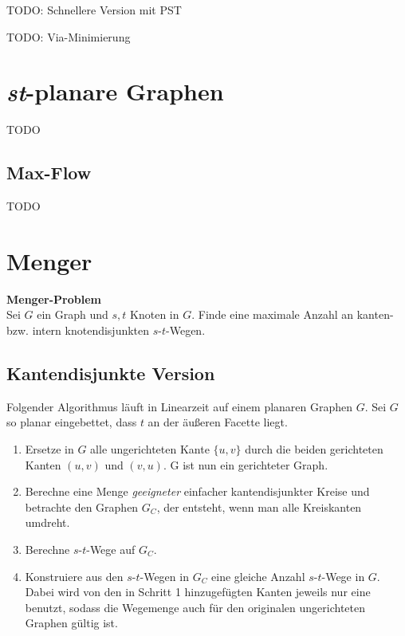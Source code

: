 \documentclass[10pt,a4paper]{article}
\begin{document}
TODO: Schnellere Version mit PST %

TODO: Via-Minimierung %




\clearpage
\section{\textit{st}-planare Graphen}

TODO %

\subsection{Max-Flow}

TODO %


\clearpage
\section{Menger}
\textbf{Menger-Problem}\\
Sei $G$ ein Graph und $s, t$ Knoten in $G$.
Finde eine maximale Anzahl an kanten- bzw. intern knotendisjunkten
$s$-$t$-Wegen.

\subsection{Kantendisjunkte Version}
Folgender Algorithmus läuft in Linearzeit auf einem planaren Graphen $G$.
Sei $G$ so planar eingebettet, dass $t$ an der äußeren Facette liegt.

\begin{enumerate}
    \item Ersetze in $G$ alle ungerichteten Kante $\{u, v\}$ durch die
        beiden gerichteten Kanten $(u,v)$ und $(v, u)$.
        G ist nun ein gerichteter Graph.
    \item Berechne eine Menge \textit{geeigneter} einfacher kantendisjunkter
        Kreise und betrachte den Graphen $G_C$, der entsteht, wenn man alle
        Kreiskanten umdreht.
    \item Berechne $s$-$t$-Wege auf $G_C$.
    \item Konstruiere aus den $s$-$t$-Wegen in $G_C$ eine gleiche Anzahl
        $s$-$t$-Wege in $G$.
        Dabei wird von den in Schritt 1 hinzugefügten Kanten jeweils nur eine
        benutzt, sodass die Wegemenge auch für den originalen ungerichteten
        Graphen gültig ist.
\end{enumerate}
\end{document}
